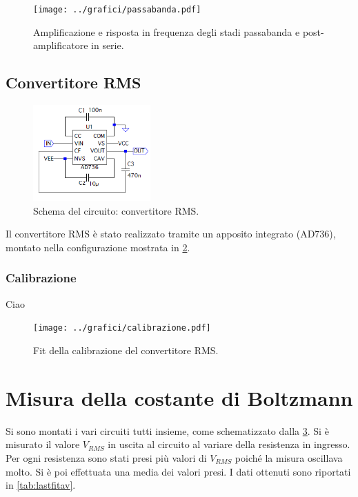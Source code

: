 \documentclass[a4paper,10pt]{article}
\begin{document}
\begin{figure}[H]
	\centering
	\texttt{[image: ../grafici/passabanda.pdf]}
	\vspace*{10pt}
	\caption{Amplificazione e risposta in frequenza degli stadi passabanda e post-amplificatore in serie.}
	\label{fig:bandpass}
\end{figure}

\subsection{Convertitore RMS}

\begin{figure}
	\vspace{-10pt}
	\centering
	\includegraphics[width=0.4\textwidth]{../grafici/RMSconverter.png}
	\vspace{-12pt}
	\caption{Schema del circuito: convertitore RMS.}
	\label{fig:RMSconv}
	\vspace{-6pt}
\end{figure}

Il convertitore RMS è stato realizzato tramite un apposito integrato (AD736), montato nella configurazione mostrata in \cref{fig:RMSconv}.

\subsubsection*{Calibrazione}

Ciao

\begin{figure}[H]
	\centering
	\texttt{[image: ../grafici/calibrazione.pdf]}
	\vspace*{10pt}
	\caption{Fit della calibrazione del convertitore RMS.}
	\label{fig:blocks}
\end{figure}

\section{Misura della costante di Boltzmann}
Si sono montati i vari circuiti tutti insieme, come schematizzato dalla \cref{fig:blocks}. Si è misurato il valore $V_{RMS}$ in uscita al circuito al variare della resistenza in ingresso. Per ogni resistenza sono stati presi più valori di $V_{RMS}$ poiché la misura oscillava molto. Si è poi effettuata una media dei valori presi. I dati ottenuti sono riportati in \cref{tab:lastfitav}.
\end{document}
